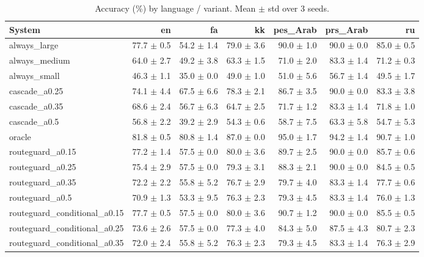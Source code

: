 \begin{table}[t]
\centering
\small
\caption{Accuracy (\%) by language / variant. Mean $\pm$ std over 3 seeds.}
\label{tab:language_breakdown}
\begin{tabular}{lrrrrrr}
\toprule
System & en & fa & kk & pes\_Arab & prs\_Arab & ru \\
\midrule
always\_large & 77.7 $\pm$ 0.5 & 54.2 $\pm$ 1.4 & 79.0 $\pm$ 3.6 & 90.0 $\pm$ 1.0 & 90.0 $\pm$ 0.0 & 85.0 $\pm$ 0.5 \\
always\_medium & 64.0 $\pm$ 2.7 & 49.2 $\pm$ 3.8 & 63.3 $\pm$ 1.5 & 71.0 $\pm$ 2.0 & 83.3 $\pm$ 1.4 & 71.2 $\pm$ 0.3 \\
always\_small & 46.3 $\pm$ 1.1 & 35.0 $\pm$ 0.0 & 49.0 $\pm$ 1.0 & 51.0 $\pm$ 5.6 & 56.7 $\pm$ 1.4 & 49.5 $\pm$ 1.7 \\
cascade\_a0.25 & 74.1 $\pm$ 4.4 & 67.5 $\pm$ 6.6 & 78.3 $\pm$ 2.1 & 86.7 $\pm$ 3.5 & 90.0 $\pm$ 0.0 & 83.3 $\pm$ 3.8 \\
cascade\_a0.35 & 68.6 $\pm$ 2.4 & 56.7 $\pm$ 6.3 & 64.7 $\pm$ 2.5 & 71.7 $\pm$ 1.2 & 83.3 $\pm$ 1.4 & 71.8 $\pm$ 1.0 \\
cascade\_a0.5 & 56.8 $\pm$ 2.2 & 39.2 $\pm$ 2.9 & 54.3 $\pm$ 0.6 & 58.7 $\pm$ 7.5 & 63.3 $\pm$ 5.8 & 54.7 $\pm$ 5.3 \\
oracle & 81.8 $\pm$ 0.5 & 80.8 $\pm$ 1.4 & 87.0 $\pm$ 0.0 & 95.0 $\pm$ 1.7 & 94.2 $\pm$ 1.4 & 90.7 $\pm$ 1.0 \\
routeguard\_a0.15 & 77.2 $\pm$ 1.4 & 57.5 $\pm$ 0.0 & 80.0 $\pm$ 3.6 & 89.7 $\pm$ 2.5 & 90.0 $\pm$ 0.0 & 85.7 $\pm$ 0.6 \\
routeguard\_a0.25 & 75.4 $\pm$ 2.9 & 57.5 $\pm$ 0.0 & 79.3 $\pm$ 3.1 & 88.3 $\pm$ 2.1 & 90.0 $\pm$ 0.0 & 84.5 $\pm$ 0.5 \\
routeguard\_a0.35 & 72.2 $\pm$ 2.2 & 55.8 $\pm$ 5.2 & 76.7 $\pm$ 2.9 & 79.7 $\pm$ 4.0 & 83.3 $\pm$ 1.4 & 77.7 $\pm$ 0.6 \\
routeguard\_a0.5 & 70.9 $\pm$ 1.3 & 53.3 $\pm$ 9.5 & 76.3 $\pm$ 2.3 & 79.3 $\pm$ 4.5 & 83.3 $\pm$ 1.4 & 76.0 $\pm$ 1.3 \\
routeguard\_conditional\_a0.15 & 77.7 $\pm$ 0.5 & 57.5 $\pm$ 0.0 & 80.0 $\pm$ 3.6 & 90.7 $\pm$ 1.2 & 90.0 $\pm$ 0.0 & 85.5 $\pm$ 0.5 \\
routeguard\_conditional\_a0.25 & 73.6 $\pm$ 2.6 & 57.5 $\pm$ 0.0 & 77.3 $\pm$ 4.0 & 84.3 $\pm$ 5.0 & 87.5 $\pm$ 4.3 & 80.7 $\pm$ 2.3 \\
routeguard\_conditional\_a0.35 & 72.0 $\pm$ 2.4 & 55.8 $\pm$ 5.2 & 76.3 $\pm$ 2.3 & 79.3 $\pm$ 4.5 & 83.3 $\pm$ 1.4 & 76.3 $\pm$ 2.9 \\
\bottomrule
\end{tabular}
\end{table}
